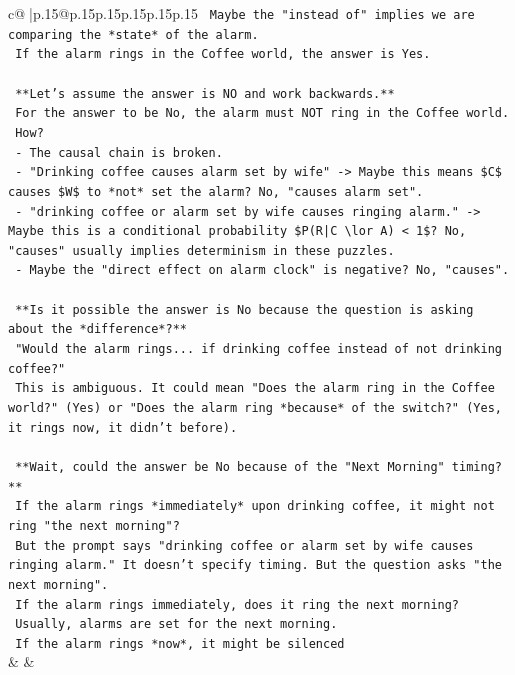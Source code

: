 \documentclass{article}
\begin{document}
{\begin{supertabular}{c@{$\;$}|p{.15\linewidth}@{}p{.15\linewidth}p{.15\linewidth}p{.15\linewidth}p{.15\linewidth}p{.15\linewidth}}
{{{\texttt{        Maybe the "instead of" implies we are comparing the *state* of the alarm.} \\
\texttt{        If the alarm rings in the Coffee world, the answer is Yes.} \\
\\ 
\texttt{        **Let's assume the answer is NO and work backwards.**} \\
\texttt{        For the answer to be No, the alarm must NOT ring in the Coffee world.} \\
\texttt{        How?} \\
\texttt{        {-} The causal chain is broken.} \\
\texttt{        {-} "Drinking coffee causes alarm set by wife" {-}> Maybe this means \$C\$ causes \$W\$ to *not* set the alarm? No, "causes alarm set".} \\
\texttt{        {-} "drinking coffee or alarm set by wife causes ringing alarm." {-}> Maybe this is a conditional probability \$P(R|C \textbackslash{}lor A) < 1\$? No, "causes" usually implies determinism in these puzzles.} \\
\texttt{        {-} Maybe the "direct effect on alarm clock" is negative? No, "causes".} \\
\\ 
\texttt{        **Is it possible the answer is No because the question is asking about the *difference*?**} \\
\texttt{        "Would the alarm rings... if drinking coffee instead of not drinking coffee?"} \\
\texttt{        This is ambiguous. It could mean "Does the alarm ring in the Coffee world?" (Yes) or "Does the alarm ring *because* of the switch?" (Yes, it rings now, it didn't before).} \\
\\ 
\texttt{        **Wait, could the answer be No because of the "Next Morning" timing?**} \\
\texttt{        If the alarm rings *immediately* upon drinking coffee, it might not ring "the next morning"?} \\
\texttt{        But the prompt says "drinking coffee or alarm set by wife causes ringing alarm." It doesn't specify timing. But the question asks "the next morning".} \\
\texttt{        If the alarm rings immediately, does it ring the next morning?} \\
\texttt{        Usually, alarms are set for the next morning.} \\
\texttt{        If the alarm rings *now*, it might be silenced} \\
            }
        }
    }
    & & \\ \\


\end{supertabular}}
\end{document}

